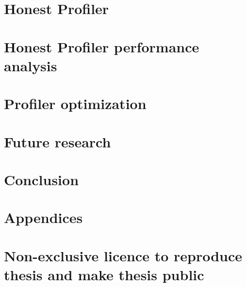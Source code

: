 \documentclass{style/thesis}
\begin{document}
\pagebreak


\section{Honest Profiler}
\label{sec:honest-profiler}

\pagebreak

\section{Honest Profiler performance analysis}
\label{sec:perf-analysis}

\pagebreak



\section{Profiler optimization}
\label{sec:optimization}


\pagebreak
\section{Future research}
\label{sec:future-research}


\clearpage
\section{Conclusion} 



\newpage

\def\urlprefix{}
\nocite{*}
{}



\newpage

\appendix
\section*{Appendices}
\renewcommand{\thesubsection}{\Alph{subsection}}

\pagebreak
\section*{Non-exclusive licence to reproduce thesis and make thesis public}
\end{document}
